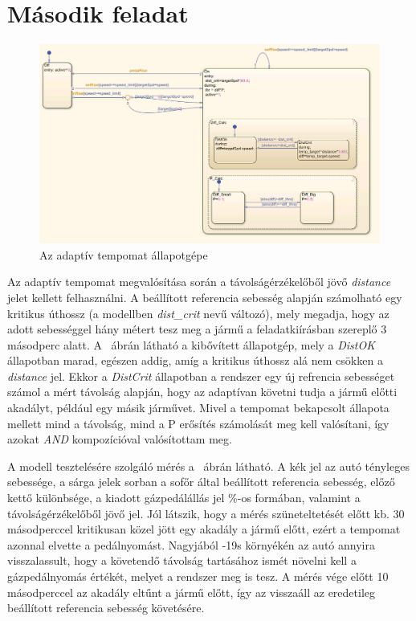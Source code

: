 \newpage
\section{Második feladat}
\begin{figure}[!ht]
	\centering
	\includegraphics[width=120mm,keepaspectratio]{figures/2m04/f2_chart_3.png}
	\caption{Az adaptív tempomat állapotgépe}
	\label{fig:chart2}
\end{figure}

Az adaptív tempomat megvalósítása során a távolságérzékelőből jövő \textit{distance} jelet kellett felhasználni. A beállított referencia sebesség alapján számolható egy kritikus úthossz (a modellben \textit{dist\_crit} nevű változó), mely megadja, hogy az adott sebességgel hány métert tesz meg a jármű a feladatkiírásban szereplő 3 másodperc alatt. A ~ábrán látható a kibővített állapotgép, mely a \textit{DistOK} állapotban marad, egészen addig, amíg a kritikus úthossz alá nem csökken a \textit{distance} jel. Ekkor a \textit{DistCrit} állapotban a rendszer egy új refrencia sebességet számol a mért távolság alapján, hogy az adaptívan követni tudja a jármű előtti akadályt, például egy másik járművet. Mivel a tempomat bekapcsolt állapota mellett mind a távolság, mind a P erősítés számolását meg kell valósítani, így azokat \textit{AND} kompozícióval valósítottam meg.

A modell tesztelésére szolgáló mérés a ~ábrán látható. A kék jel az autó tényleges sebessége, a sárga jelek sorban a sofőr által beállított referencia sebesség, előző kettő különbsége, a kiadott gázpedálállás jel \%-os formában, valamint a távolságérzékelőből jövő jel. Jól látszik, hogy a mérés szüneteltetését előtt kb. 30 másodperccel kritikusan közel jött egy akadály a jármű előtt, ezért a tempomat azonnal elvette a pedálnyomást. Nagyjából -19s környékén az autó annyira visszalassult, hogy a követendő távolság tartásához ismét növelni kell a gázpedálnyomás értékét, melyet a rendszer meg is tesz. A mérés vége előtt 10 másodperccel az akadály eltűnt a jármű előtt, így az visszaáll az eredetileg beállított referencia sebesség követésére.

